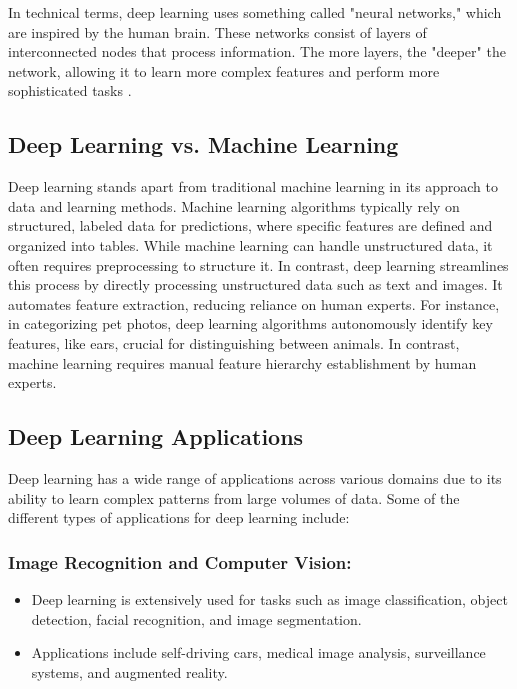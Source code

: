 In technical terms, deep learning uses something called "neural networks," which are inspired by the human brain. These networks consist of layers of interconnected nodes that process information. The more layers, the "deeper" the network, allowing it to learn more complex features and perform more sophisticated tasks \cite{datacamp:dl}.


\subsection{Deep Learning vs. Machine Learning}

Deep learning stands apart from traditional machine learning in its approach to data and learning methods.
Machine learning algorithms typically rely on structured, labeled data for predictions, where specific features are defined and organized into tables.
While machine learning can handle unstructured data, it often requires preprocessing to structure it. In contrast, deep learning streamlines this process by directly processing unstructured data such as text and images. It automates feature extraction, reducing reliance on human experts. For instance, in categorizing pet photos, deep learning algorithms autonomously identify key features, like ears, crucial for distinguishing between animals. In contrast, machine learning requires manual feature hierarchy establishment by human experts.

\subsection{Deep Learning Applications}

Deep learning has a wide range of applications across various domains due to its ability to learn complex patterns from large volumes of data. Some of the different types of applications for deep learning include:

\subsubsection*{Image Recognition and Computer Vision:}

\begin{itemize}
    \item Deep learning is extensively used for tasks such as image classification, object detection, facial recognition, and image segmentation.
    \item Applications include self-driving cars, medical image analysis, surveillance systems, and augmented reality.
\end{itemize}

